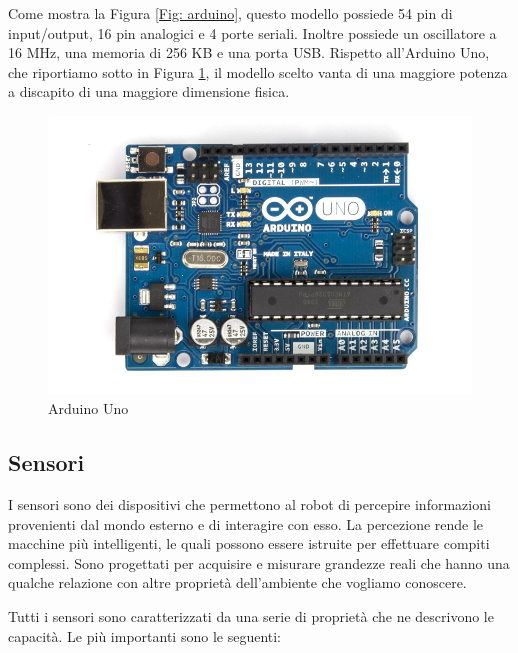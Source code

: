 \documentclass[a4paper,12pt,italian]{article}
\begin{document}
Come mostra la Figura \ref{Fig: arduino}, questo modello possiede 54 pin di input/output, 16 pin analogici e 4 porte seriali. Inoltre possiede un oscillatore a 16 MHz, una memoria di 256 KB e una porta USB. Rispetto all’Arduino Uno, che riportiamo sotto in Figura \ref{Fig: arduino_uno}, il modello scelto vanta di una maggiore potenza a discapito di una maggiore dimensione fisica.

\begin{figure}[H]
\begin{center}
\includegraphics[scale=0.6]{arduino_uno}
\caption{Arduino Uno}
\label{Fig: arduino_uno}
\end{center}
\end{figure}

\subsection{Sensori}
\label{subsec: sensori}
I sensori sono dei dispositivi che permettono al robot di percepire informazioni provenienti dal mondo esterno e di interagire con esso. La percezione rende le macchine più intelligenti, le quali possono essere istruite per effettuare compiti complessi. Sono progettati per acquisire e misurare grandezze reali che hanno una qualche relazione con altre proprietà dell’ambiente che vogliamo conoscere. 

Tutti i sensori sono caratterizzati da una serie di proprietà che ne descrivono le capacità. Le più importanti sono le seguenti:
\end{document}
